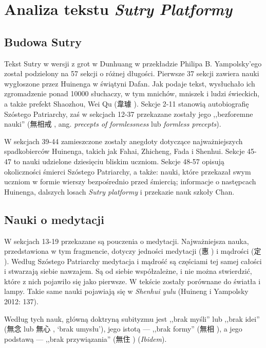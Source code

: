 \chapter{Analiza tekstu \textit{Sutry Platformy}}

\section{Budowa Sutry}
Tekst Sutry w wersji z grot w Dunhuang w przekładzie Philipa B. Yampolsky'ego został podzielony na 57 sekcji o różnej długości. Pierwsze 37 sekcji zawiera nauki wygłoszone przez Huinenga w świątyni Dafan. Jak podaje tekst, wysłuchało ich zgromadzenie ponad 10000 słuchaczy, w tym mnichów, mniszek i ludzi świeckich, a także prefekt Shaozhou, Wei Qu (韋璩 ). Sekcje 2-11 stanowią autobiografię Szóstego Patriarchy, zaś w sekcjach 12-37 przekazane zostały jego ,,bezforemne nauki'' (無相戒 , ang. \textit{precepts of formlessness} lub \textit{formless precepts}).

W sekcjach 39-44 zamieszczone zostały anegdoty dotyczące najważniejszych spadkobierców Huinenga, takich jak Fahai, Zhicheng, Fada i Shenhui. Sekcje 45-47 to nauki udzielone dziesięciu bliskim uczniom. Sekcje 48-57 opisują okoliczności śmierci Szóstego Patriarchy, a także: nauki, które przekazał swym uczniom w formie wierszy bezpośrednio przed śmiercią; informacje o następcach Huinenga, dalszych losach \textit{Sutry platformy} i przekazie nauk szkoły Chan.

\section{Nauki o medytacji}
W sekcjach 13-19 przekazane są pouczenia o medytacji. Najważniejsza nauka, przedstawiona w tym fragmencie, dotyczy jedności medytacji (惠 ) i mądrości (定 ). Według Szóstego Patriarchy medytacja i mądrość są częściami tej samej całości i stwarzają siebie nawzajem. Są od siebie współzależne, i nie można stwierdzić, które z nich pojawiło się jako pierwsze. W tekście zostały porównane do światła i lampy. Takie same nauki pojawiają się w \textit{Shenhui yulu} (Huineng i Yampolsky 2012: 137).

Według tych nauk, główną doktryną subityzmu jest ,,brak myśli'' lub ,,brak idei'' (無念  lub 無心 , `brak umysłu'), jego istotą --- ,,brak formy'' (無相 ), a jego podstawą --- ,,brak przywiązania'' (無住 ) (\textit{Ibidem}).

